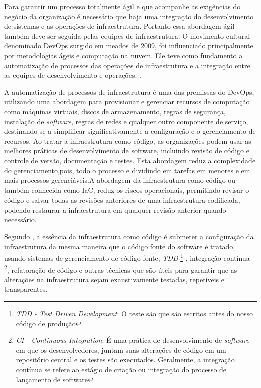 Para garantir um processo totalmente ágil e que acompanhe as exigências do negócio da organização é necessário que haja uma integração do desenvolvimento de sistemas e as operações de infraestrutura. Portanto essa abordagem ágil também deve ser seguida pelas equipes de infraestrutura.
O movimento cultural denominado DevOps surgido em meados de 2009, foi influenciado principalmente por metodologias ágeis e computação na nuvem. Ele teve como fundamento a automatização de processos das operações de infraestrutura e a integração entre as equipes de desenvolvimento e operações. \cite{sato}.

A automatização de processos de infraestrutura é uma das premissas do DevOps, utilizando uma abordagem para provisionar e gerenciar recursos de computação como máquinas virtuais, discos de armazenamento, regras de segurança, instalação de \textit{software}, regras de redes e qualquer outro componente de serviço, destinando-se a simplificar significativamente a configuração e o gerenciamento de recursos. Ao tratar a infraestrutura como código, as organizações podem usar as melhores práticas de desenvolvimento de software, incluindo revisão de código e controle de versão, documentação e testes. Esta abordagem reduz a complexidade do gerenciamento,pois, todo o processo e dividindo em tarefas em menores e em mais processos gerenciáveis.A abordagem da infraestrutura como código ou também conhecida como IaC, reduz os riscos operacionais, permitindo revisar o código e salvar todas as revisões anteriores de uma infraestrutura codificada, podendo restaurar a infraestrutura em qualquer revisão anterior quando necessário.

Segundo , a essência da infraestrutura como código é submeter a configuração da infraestrutura da mesma maneira que o código fonte do software é tratado, usando sistemas de gerenciamento de código-fonte, \textit{TDD} \footnote{\textit{TDD - Test Driven Development}: O teste são que são escritos antes do nosso código de produção} , integração contínua \footnote{\textit{CI - Continuous Integration}: É uma prática de desenvolvimento de \textit{software} em que os desenvolvedores, juntam suas alterações de código em um repositório central e os testes são executados. Geralmente, a integração contínua se refere ao estágio de criação ou integração do processo de lançamento de software  }, refatoração de código e outras técnicas que são úteis para garantir que as alterações na infraestrutura sejam exaustivamente testadas, repetíveis e transparentes.



